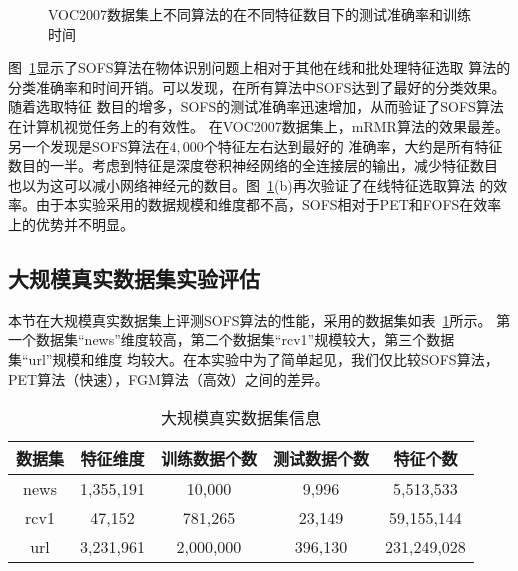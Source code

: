 \begin{figure}
    \centerline{
    }
    \caption{VOC2007数据集上不同算法的在不同特征数目下的测试准确率和训练时间}
    \label{fig:sofs-voc-comp}
\end{figure}
图~\ref{fig:sofs-voc-comp}显示了SOFS算法在物体识别问题上相对于其他在线和批处理特征选取
算法的分类准确率和时间开销。可以发现，在所有算法中SOFS达到了最好的分类效果。随着选取特征
数目的增多，SOFS的测试准确率迅速增加，从而验证了SOFS算法在计算机视觉任务上的有效性。
在VOC2007数据集上，mRMR算法的效果最差。另一个发现是SOFS算法在$4,000$个特征左右达到最好的
准确率，大约是所有特征数目的一半。考虑到特征是深度卷积神经网络的全连接层的输出，减少特征数目
也以为这可以减小网络神经元的数目。图~\ref{fig:sofs-voc-comp}(b)再次验证了在线特征选取算法
的效率。由于本实验采用的数据规模和维度都不高，SOFS相对于PET和FOFS在效率上的优势并不明显。

\subsection{大规模真实数据集实验评估}
本节在大规模真实数据集上评测SOFS算法的性能，采用的数据集如表~\ref{tbl:sofs-large-datasets}所示。
第一个数据集``news''维度较高，第二个数据集``rcv1''规模较大，第三个数据集``url''规模和维度
均较大。在本实验中为了简单起见，我们仅比较SOFS算法，PET算法（快速），FGM算法（高效）之间的差异。
\begin{table}[htbp]
    \centering
    \caption{大规模真实数据集信息}
    \label{tbl:sofs-large-datasets}
    \begin{tabular}{|c|c|c|c|c|}
        \hline
        数据集 & 特征维度 & 训练数据个数 & 测试数据个数 & 特征个数 \\
        \hline
        news & 1,355,191 & 10,000  & 9,996  & 5,513,533 \\
        \hline
        rcv1 & 47,152 & 781,265 & 23,149 & 59,155,144 \\
        \hline
        url & 3,231,961 & 2,000,000    & 396,130 & 231,249,028\\
        \hline
    \end{tabular}
\end{table}

